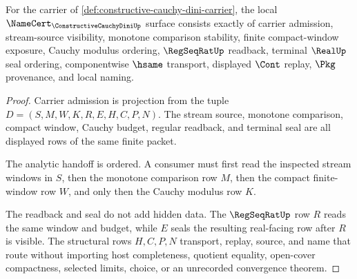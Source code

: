 \begin{theorem}
\label{thm:constructive-cauchy-dini-namecert-obligations}
For the carrier of \autoref{def:constructive-cauchy-dini-carrier}, the local $\NameCert_{\ConstructiveCauchyDiniUp}$ surface consists exactly of carrier admission, stream-source visibility, monotone comparison stability, finite compact-window exposure, Cauchy modulus ordering, $\RegSeqRatUp$ readback, terminal $\RealUp$ seal ordering, componentwise $\hsame$ transport, displayed $\Cont$ replay, $\Pkg$ provenance, and local naming.
\end{theorem}
\begin{proof}
Carrier admission is projection from the tuple $D=(S,M,W,K,R,E,H,C,P,N)$. The stream source, monotone comparison, compact window, Cauchy budget, regular readback, and terminal seal are all displayed rows of the same finite packet.

The analytic handoff is ordered. A consumer must first read the inspected stream windows in $S$, then the monotone comparison row $M$, then the compact finite-window row $W$, and only then the Cauchy modulus row $K$.

The readback and seal do not add hidden data. The $\RegSeqRatUp$ row $R$ reads the same window and budget, while $E$ seals the resulting real-facing row after $R$ is visible. The structural rows $H,C,P,N$ transport, replay, source, and name that route without importing host completeness, quotient equality, open-cover compactness, selected limits, choice, or an unrecorded convergence theorem.
\end{proof}

